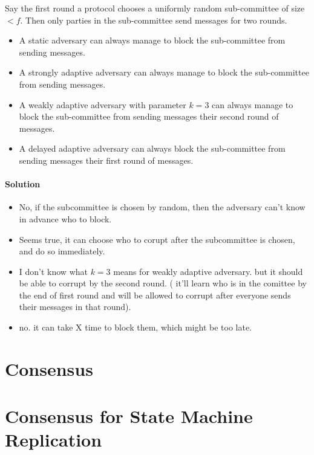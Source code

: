 \begin{xca}[Quiz 1.I]
    Say the first round a protocol chooses a uniformly random sub-committee of 
    size $<f$. Then only parties in the sub-committee send messages for two rounds.
    \begin{itemize} 
        \item A static adversary can always manage to block the sub-committee from sending messages.
        \item A strongly adaptive adversary can always manage to block the sub-committee from sending messages.
        \item A weakly adaptive adversary with parameter $k=3$ can always manage to block the sub-committee from sending messages their second round of messages.
        \item A delayed adaptive adversary can always block the sub-committee from sending messages their first round of messages.
    \end{itemize}
    
\paragraph{Solution}
\begin{itemize}
    \item No, if the subcommittee is chosen by random, then the adversary can't know in advance who to block.
    \item Seems true, it can choose who to corupt after the subcommittee is chosen, and do so immediately.
    \item I don't know what $k=3$ means for weakly adaptive adversary. but it should be able to corrupt by the second round.
    ( it'll learn who is in the comittee by the end of first round and will be allowed to corrupt after everyone sends their messages in that round).
    \item no. it can take X time to block them, which might be too late.
\end{itemize}
\end{xca}

\section{Consensus}
\section{Consensus for State Machine Replication}

